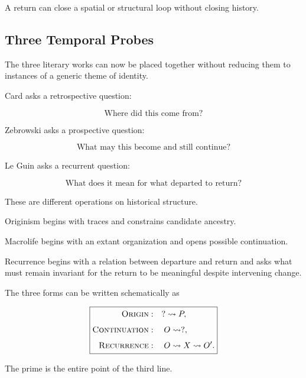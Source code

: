 \documentclass[
  11pt,
  a4paper,
  DIV=12,
  BCOR=0mm,
  parskip=half-
]{scrartcl}
\newcommand{\leadsto}{\rightsquigarrow}
\theoremstyle{definition}
\theoremstyle{plain}
\theoremstyle{remark}
\begin{document}
A return can close a spatial or structural loop without closing history.


\subsection{Three Temporal Probes}
\label{sec:three-probes}

The three literary works can now be placed together without reducing them to
instances of a generic theme of identity.

Card asks a retrospective question:

\[
  \text{Where did this come from?}
\]

Zebrowski asks a prospective question:

\[
  \text{What may this become and still continue?}
\]

Le Guin asks a recurrent question:

\[
  \text{What does it mean for what departed to return?}
\]

These are different operations on historical structure.

Originism begins with traces and constrains candidate ancestry.

Macrolife begins with an extant organization and opens possible continuation.

Recurrence begins with a relation between departure and return and asks what
must remain invariant for the return to be meaningful despite intervening
change.

The three forms can be written schematically as

\[
  \boxed{
  \begin{aligned}
    \textsc{Origin}
      &:\quad
      ?\leadsto P,
      \\[4pt]
    \textsc{Continuation}
      &:\quad
      O\leadsto ?,
      \\[4pt]
    \textsc{Recurrence}
      &:\quad
      O\leadsto X\leadsto O'.
  \end{aligned}
  }
\]

The prime is the entire point of the third line.

\end{document}
